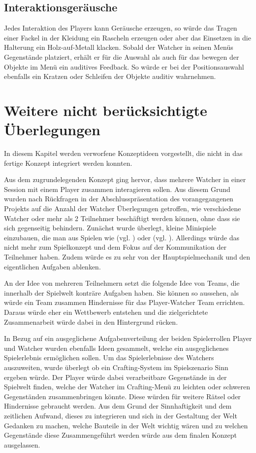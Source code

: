 \subsection{Interaktionsgeräusche}
Jedes Interaktion des Players kann Geräusche erzeugen, so würde das Tragen einer Fackel in der Kleidung ein Rascheln erzeugen oder aber das Einsetzen in die Halterung ein Holz-auf-Metall klacken. Sobald der Watcher in seinen Menüs Gegenstände platziert, erhält er für die Auswahl als auch für das bewegen der Objekte im Menü ein auditives Feedback. So würde er bei der Positionsauswahl ebenfalls ein Kratzen oder Schleifen der Objekte auditiv wahrnehmen.


\section{Weitere nicht berücksichtigte Überlegungen}
In diesem Kapitel werden verworfene Konzeptideen vorgestellt, die nicht in das fertige Konzept integriert werden konnten.

Aus dem zugrundelegenden Konzept ging hervor, dass mehrere Watcher in einer Session mit einem Player zusammen interagieren sollen. Aus diesem Grund wurden nach Rückfragen in der Abschlusspräsentation des vorangegangenen Projekts auf die Anzahl der Watcher Überlegungen getroffen, wie verschiedene Watcher oder mehr als 2 Teilnehmer beschäftigt werden können, ohne dass sie sich gegenseitig behindern. Zunächst wurde überlegt, kleine Minispiele einzubauen, die man aus Spielen wie  (vgl. \cite{everbyte_duskwood_nodate}) oder  (vgl. \cite{jaunt_sentence_nodate}). Allerdings würde das nicht mehr zum Spielkonzept und dem Fokus auf der Kommunikation der Teilnehmer haben. Zudem würde es zu sehr von der Hauptspielmechanik und den eigentlichen Aufgaben ablenken.

An der Idee von mehreren Teilnehmern setzt die folgende Idee von Teams, die innerhalb der Spielwelt konträre Aufgaben haben. Sie können so aussehen, als würde ein Team zusammen Hindernisse für das Player-Watcher Team errichten. Daraus würde eher ein Wettbewerb entstehen und die zielgerichtete Zusammenarbeit würde dabei in den Hintergrund rücken.



In Bezug auf ein ausgeglichene Aufgabenverteilung der beiden Spielerrollen Player und Watcher wurden ebenfalls Ideen gesammelt, welche ein ausgeglichenes Spielerlebnis ermöglichen sollen. Um das Spielerlebnisse des Watchers auszuweiten, wurde überlegt ob ein Crafting-System im Spielszenario Sinn ergeben würde. Der Player würde dabei verarbeitbare Gegenstände in der Spielwelt finden, welche der Watcher im Crafting-Menü zu leichten oder schweren Gegenständen zusammenbringen könnte. Diese würden für weitere Rätsel oder Hindernisse gebraucht werden. Aus dem Grund der Sinnhaftigkeit und dem zeitlichen Aufwand, dieses zu integrieren und sich in der Gestaltung der Welt Gedanken zu machen, welche Bauteile in der Welt wichtig wären und zu welchen Gegenstände diese Zusammengeführt werden würde aus dem finalen Konzept ausgelassen.

